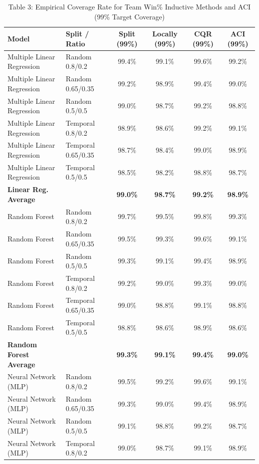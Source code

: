\documentclass[11pt,a4paper]{article}
\begin{document}
\begin{table}[H]
\centering
\caption{Table 3: Empirical Coverage Rate for Team Win\% Inductive Methods and ACI (99\% Target Coverage)}
\label{tab:team_tab3}
\scriptsize
\begin{tabular}{llcccc}
\toprule
Model & Split / Ratio & Split (99\%) & Locally (99\%) & CQR (99\%) & ACI (99\%) \\
\midrule
Multiple Linear Regression & Random 0.8/0.2 & 99.4\% & 99.1\% & 99.6\% & 99.2\% \\
Multiple Linear Regression & Random 0.65/0.35 & 99.2\% & 98.9\% & 99.4\% & 99.0\% \\
Multiple Linear Regression & Random 0.5/0.5 & 99.0\% & 98.7\% & 99.2\% & 98.8\% \\
Multiple Linear Regression & Temporal 0.8/0.2 & 98.9\% & 98.6\% & 99.2\% & 99.1\% \\
Multiple Linear Regression & Temporal 0.65/0.35 & 98.7\% & 98.4\% & 99.0\% & 98.9\% \\
Multiple Linear Regression & Temporal 0.5/0.5 & 98.5\% & 98.2\% & 98.8\% & 98.7\% \\
\textbf{Linear Reg. Average} & & \textbf{99.0\%} & \textbf{98.7\%} & \textbf{99.2\%} & \textbf{98.9\%} \\
\midrule
Random Forest & Random 0.8/0.2 & 99.7\% & 99.5\% & 99.8\% & 99.3\% \\
Random Forest & Random 0.65/0.35 & 99.5\% & 99.3\% & 99.6\% & 99.1\% \\
Random Forest & Random 0.5/0.5 & 99.3\% & 99.1\% & 99.4\% & 98.9\% \\
Random Forest & Temporal 0.8/0.2 & 99.2\% & 99.0\% & 99.3\% & 99.0\% \\
Random Forest & Temporal 0.65/0.35 & 99.0\% & 98.8\% & 99.1\% & 98.8\% \\
Random Forest & Temporal 0.5/0.5 & 98.8\% & 98.6\% & 98.9\% & 98.6\% \\
\textbf{Random Forest Average} & & \textbf{99.3\%} & \textbf{99.1\%} & \textbf{99.4\%} & \textbf{99.0\%} \\
\midrule
Neural Network (MLP) & Random 0.8/0.2 & 99.5\% & 99.2\% & 99.6\% & 99.1\% \\
Neural Network (MLP) & Random 0.65/0.35 & 99.3\% & 99.0\% & 99.4\% & 98.9\% \\
Neural Network (MLP) & Random 0.5/0.5 & 99.1\% & 98.8\% & 99.2\% & 98.7\% \\
Neural Network (MLP) & Temporal 0.8/0.2 & 99.0\% & 98.7\% & 99.1\% & 98.9\% \\

\end{tabular}
\end{table}
\end{document}
